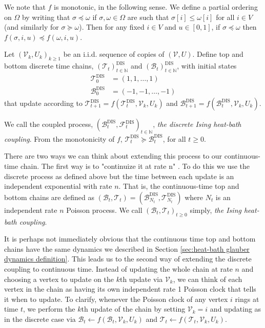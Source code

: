 	We note that $f$ is monotonic, in the following sense. We define a partial ordering on $\Omega$ by writing that $\sigma \preceq \omega$ if $\sigma, \omega \in \Omega$ are such that $\sigma[i] \leq \omega[i]$ for all $i \in V$ (and similarly for $\sigma \succeq \omega$). Then for any fixed $i \in V$ and $u \in [0,1]$, if $\sigma \preceq \omega$ then $f(\sigma, i, u) \preceq f(\omega, i, u)$.
	
	Let $(\mathscr{V}_k, U_k)_{k \geq 1}$ be an i.i.d. sequence of copies of $(\mathscr{V}, U)$. Define top and bottom discrete time chains, $(\mathscr{T}_t)_{t\in \mathbb{N}}^\mathrm{DIS}$ and $(\mathscr{B}_t)_{t\in \mathbb{N}}^\mathrm{DIS}$, with initial states
	\begin{align}
		\mathscr{T}_0^\mathrm{DIS} &= (1, 1, \dots, 1)\\
		\mathscr{B}_0^\mathrm{DIS} &= (-1, -1, \dots, -1)
	\end{align}
	that update according to $\mathscr{T}_{t+1}^\mathrm{DIS} = f(\mathscr{T}_{t}^\mathrm{DIS}, \mathscr{V}_k, U_k)$ and $\mathscr{B}_{t+1}^\mathrm{DIS} = f(\mathscr{B}_{t}^\mathrm{DIS}, \mathscr{V}_k, U_k)$.

	We call the coupled process, $(\mathscr{B}_t^\mathrm{DIS}, \mathscr{F}_t^\mathrm{DIS})_{t\in \mathbb{N}}$, \emph{the discrete Ising heat-bath coupling}. From the monotonicity of $f$, $\mathscr{T}_t^\mathrm{DIS} \succeq \mathscr{B}_t^\mathrm{DIS}$, for all $t \geq 0$.

	There are two ways we can think about extending this process to our continuous-time chain. The first way is to "continuize it at rate n" \cite{Levin2009-fo}. To do this we use the discrete process as defined above but the time between each update is an independent exponential with rate $n$. That is, the continuous-time top and bottom chains are defined as $(\mathscr{B}_t, \mathscr{T}_t) = (\mathscr{B}_{N_t}^\mathrm{DIS}, \mathscr{T}_{N_t}^\mathrm{DIS})$ where $N_t$ is an independent rate $n$ Poisson process. We call $(\mathscr{B}_t, \mathscr{T}_t)_{t\geq 0}$ simply, \emph{the Ising heat-bath coupling}.

	It is perhaps not immediately obvious that the continuous time top and bottom chains have the same dynamics we described in Section \ref{sec:heat-bath glauber dynamics definition}. This leads us to the second way of extending the discrete coupling to continuous time. Instead of updating the whole chain at rate $n$ and choosing a vertex to update on the $k$th update via $\mathcal{V}_k$, we can think of each vertex in the chain as having its own independent rate 1 Poisson clock that tells it when to update. To clarify, whenever the Poisson clock of any vertex $i$ rings at time $t$, we perform the $k$th update of the chain by setting $\mathcal{V}_k = i$ and updating as in the discrete case via $\mathscr{B}_t \leftarrow f(\mathscr{B}_t, \mathcal{V}_k, U_k)$ and $\mathscr{T}_t \leftarrow f(\mathscr{T}_t, \mathcal{V}_k, U_k)$.

